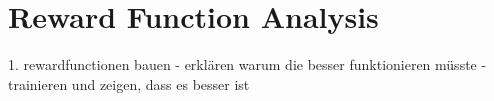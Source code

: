 \chapter{Reward Function Analysis}

1. rewardfunctionen bauen - erklären warum die besser funktionieren müsste - trainieren und zeigen, dass es besser ist